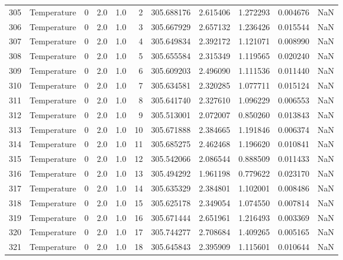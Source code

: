 \begin{tabular}{llrrrrrrrrr}
305 &  Temperature &       0 &  2.0 &  1.0 &    2 &  305.688176 &  2.615406 &  1.272293 &   0.004676 &      NaN \\
306 &  Temperature &       0 &  2.0 &  1.0 &    3 &  305.667929 &  2.657132 &  1.236426 &   0.015544 &      NaN \\
307 &  Temperature &       0 &  2.0 &  1.0 &    4 &  305.649834 &  2.392172 &  1.121071 &   0.008990 &      NaN \\
308 &  Temperature &       0 &  2.0 &  1.0 &    5 &  305.655584 &  2.315349 &  1.119565 &   0.020240 &      NaN \\
309 &  Temperature &       0 &  2.0 &  1.0 &    6 &  305.609203 &  2.496090 &  1.111536 &   0.011440 &      NaN \\
310 &  Temperature &       0 &  2.0 &  1.0 &    7 &  305.634581 &  2.320285 &  1.077711 &   0.015124 &      NaN \\
311 &  Temperature &       0 &  2.0 &  1.0 &    8 &  305.641740 &  2.327610 &  1.096229 &   0.006553 &      NaN \\
312 &  Temperature &       0 &  2.0 &  1.0 &    9 &  305.513001 &  2.072007 &  0.850260 &   0.013843 &      NaN \\
313 &  Temperature &       0 &  2.0 &  1.0 &   10 &  305.671888 &  2.384665 &  1.191846 &   0.006374 &      NaN \\
314 &  Temperature &       0 &  2.0 &  1.0 &   11 &  305.685275 &  2.462468 &  1.196620 &   0.010841 &      NaN \\
315 &  Temperature &       0 &  2.0 &  1.0 &   12 &  305.542066 &  2.086544 &  0.888509 &   0.011433 &      NaN \\
316 &  Temperature &       0 &  2.0 &  1.0 &   13 &  305.494292 &  1.961198 &  0.779622 &   0.023170 &      NaN \\
317 &  Temperature &       0 &  2.0 &  1.0 &   14 &  305.635329 &  2.384801 &  1.102001 &   0.008486 &      NaN \\
318 &  Temperature &       0 &  2.0 &  1.0 &   15 &  305.625178 &  2.349054 &  1.074550 &   0.007814 &      NaN \\
319 &  Temperature &       0 &  2.0 &  1.0 &   16 &  305.671444 &  2.651961 &  1.216493 &   0.003369 &      NaN \\
320 &  Temperature &       0 &  2.0 &  1.0 &   17 &  305.744277 &  2.708684 &  1.409265 &   0.005165 &      NaN \\
321 &  Temperature &       0 &  2.0 &  1.0 &   18 &  305.645843 &  2.395909 &  1.115601 &   0.010644 &      NaN \\

\end{tabular}
